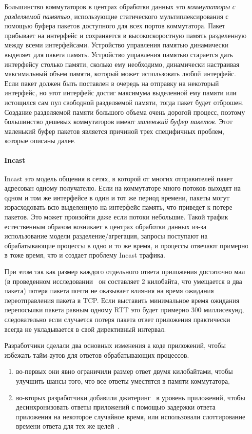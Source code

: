 \documentclass[14pt, a4paper,oneside]{extarticle}
\begin{document}
Большинство коммутаторов в центрах обработки данных это \emph{коммутаторы с разделяемой памятью}, использующие статического мультиплексирования с помощью буфера пакетов доступного для всех портов коммутатора. Пакет прибывает на интерфейс и сохраняется в высокоскоростную память разделенную между всеми интерфейсами. Устройство управления памятью динамически выделяет для пакета память. Устройство управления памятью старается дать интерфейсу столько памяти, сколько ему необходимо, динамически настраивая максимальный объем памяти, который может использовать любой интерфейс.
Если пакет должен быть поставлен в очередь на отправку на некоторый интерфейс, но этот интерфейс достиг максимума выделенной ему памяти или истощился сам пул свободной разделяемой памяти, тогда пакет будет отброшен. Создание разделяемой памяти большого объема очень дорогой процесс, поэтому большинство дешевых коммутаторов имеют \emph{маленький буфер пакетов}. Этот маленький буфер пакетов является причиной трех специфичных проблем, которые описаны далее.

\paragraph{Incast}

Incast это модель общения в сетях, в которой от многих отправителей пакет адресован одному получателю. Если на коммутаторе много потоков выходят на одном и том же интерфейсе в один и тот же период времени, пакеты могут израсходовать всю выделенную на интерфейс память, что приведет к потере пакетов. Это может произойти даже если потоки небольшие. Такой трафик естественным образом возникает в центрах обработки данных из-за использование модели разделение/агрегация, запросы поступают на обрабатывающие процессы в одно и то же время, и процессы отвечают примерно в тоже время, что и создает проблему Incast трафика.

При этом так как размер каждого отдельного ответа приложения достаточно мал (в проведенном исследовании~\cite{dctcp} он составляет 2 килобайта, что умещается в два пакета) потеря пакета почти не оказывает влияния на время ожидания переотправления пакета в TCP. Если выставить минимальное время ожидания перепосылки пакета равным одному RTT это будет примерно 300 миллисекунд, следовательно если случается потеря пакета ответ приложения практически всегда не укладывается в свой директивный интервал.

Разработчики сделали два основных изменения а коде приложений, чтобы избежать тайм-аутов для ответов обрабатывающих процессов.
\begin{enumerate}
\item во-первых они явно ограничили размер ответ двумя килобайтами, чтобы улучшить шансы того, что все ответы уместятся в памяти коммутатора,
\item во-вторых разработчики добавили джитеринг~\cite{jittering} в уровень приложений, чтобы десинхронизовать ответы приложений с помощью задержки ответа приложения на некоторое случайное время, или использовали слоттирование времени ответа для тех же целей~\cite{ictcp}.
\end{enumerate}
\end{document}
